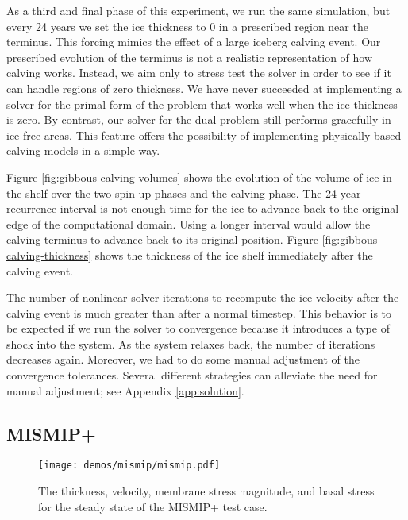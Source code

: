 \documentclass{article}
\theoremstyle{definition}
\theoremstyle{plain}
\begin{document}
As a third and final phase of this experiment, we run the same simulation, but every 24 years we set the ice thickness to 0 in a prescribed region near the terminus.
This forcing mimics the effect of a large iceberg calving event.
Our prescribed evolution of the terminus is not a realistic representation of how calving works.
Instead, we aim only to stress test the solver in order to see if it can handle regions of zero thickness.
We have never succeeded at implementing a solver for the primal form of the problem that works well when the ice thickness is zero.
By contrast, our solver for the dual problem still performs gracefully in ice-free areas.
This feature offers the possibility of implementing physically-based calving models in a simple way.

Figure \ref{fig:gibbous-calving-volumes} shows the evolution of the volume of ice in the shelf over the two spin-up phases and the calving phase.
The 24-year recurrence interval is not enough time for the ice to advance back to the original edge of the computational domain.
Using a longer interval would allow the calving terminus to advance back to its original position.
Figure \ref{fig:gibbous-calving-thickness} shows the thickness of the ice shelf immediately after the calving event.

The number of nonlinear solver iterations to recompute the ice velocity after the calving event is much greater than after a normal timestep.
This behavior is to be expected if we run the solver to convergence because it introduces a type of shock into the system.
As the system relaxes back, the number of iterations decreases again.
Moreover, we had to do some manual adjustment of the convergence tolerances.
Several different strategies can alleviate the need for manual adjustment; see Appendix \ref{app:solution}.

\subsection{MISMIP+} \label{sec:mismip}

\begin{figure}[t]
    \begin{center}
        \texttt{[image: demos/mismip/mismip.pdf]}
    \end{center}
    \caption{The thickness, velocity, membrane stress magnitude, and basal stress for the steady state of the MISMIP+ test case.}
    \label{fig:mismip}
\end{figure}
\end{document}
